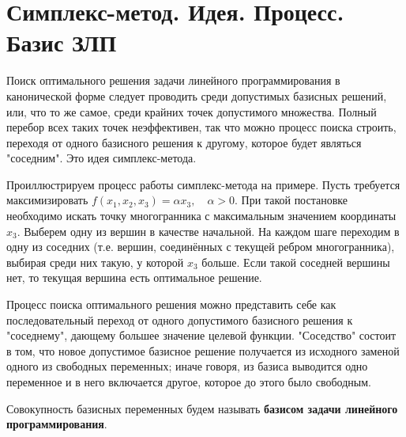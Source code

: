 \documentclass[17pt]{extarticle}
\begin{document}
\section{Симплекс-метод. Идея. Процесс. Базис ЗЛП}

Поиск оптимального решения задачи линейного программирования в канонической форме следует проводить среди допустимых базисных решений, или, что то же самое, среди крайних точек допустимого множества. Полный перебор всех таких точек неэффективен, так что можно процесс поиска строить, переходя от одного базисного решения к другому, которое будет являться "соседним". Это идея симплекс-метода.

Проиллюстрируем процесс работы симплекс-метода на примере. Пусть требуется максимизировать \( f(x_1, x_2, x_3) = \alpha x_3, \quad \alpha > 0 \). При такой постановке необходимо искать точку многогранника с максимальным значением координаты \( x_3 \).
Выберем одну из вершин в качестве начальной. На каждом шаге переходим в одну из соседних (т.е. вершин, соединённых с текущей ребром многогранника), выбирая среди них такую, у которой \( x_3 \) больше. Если такой соседней вершины нет, то текущая вершина есть оптимальное решение.

Процесс поиска оптимального решения можно представить себе как последовательный переход от одного допустимого базисного решения к "соседнему", дающему большее значение целевой функции. "Соседство" состоит в том, что новое допустимое базисное решение получается из исходного заменой одного из свободных переменных; иначе говоря, из базиса выводится одно переменное и в него включается другое, которое до этого было свободным.

Совокупность базисных переменных будем называть \textbf{базисом задачи линейного программирования}.
\end{document}
